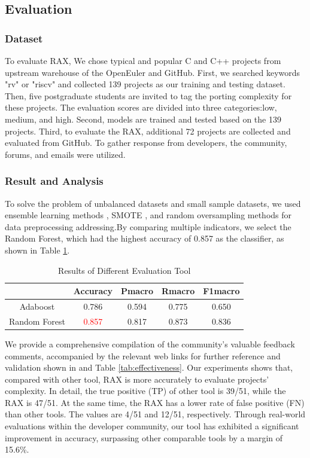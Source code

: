 \documentclass[sigconf,screen,review,anonymous]{acmart}
\begin{document}
{\subsection{Evaluation}
\subsubsection{Dataset}
 To evaluate RAX, We chose typical and popular C and C++ projects from upstream warehouse of the OpenEuler and GitHub\citep{stage2023}. First, we searched keywords "rv" or "riscv" and collected 139 projects as our training and testing dataset. Then, five postgraduate students are invited to tag the porting complexity for these projects. The evaluation scores are divided into three categories:low, medium, and high\citep{githubss}. Second, models are trained and tested based on the 139 projects. Third, to evaluate the RAX, additional 72 projects are collected and evaluated from GitHub. To gather response from developers, the community, forums, and emails were utilized. 
\subsubsection{Result and Analysis}
To solve the problem of unbalanced datasets and small sample datasets, we used ensemble learning methods \cite{6509481}, SMOTE \cite{4271036}, and random oversampling methods for data preprocessing\cite{5128907} addressing.By comparing multiple indicators, we select the Random Forest, which had the highest accuracy of 0.857 as the classifier, as shown in Table \ref{tab:evaluation}.

\begin{table}
  \caption{Results of Different Evaluation Tool}
  \label{tab:evaluation}
  \begin{tabular}{ccccc}
    \toprule
     & Accuracy & Pmacro & Rmacro & F1macro \\
    \midrule
    Adaboost & 0.786 & 0.594 & 0.775 & 0.650 \\
    Random Forest & \textcolor{red}{0.857} & 0.817 & 0.873 & 0.836 \\
  \bottomrule
\end{tabular}
\end{table}

We provide a comprehensive compilation of the community's valuable feedback comments, accompanied by the relevant web links for further reference and validation shown in \cite{githubss} and Table \ref{tab:effectiveness}. Our experiments shows that, compared with other tool, RAX is more accurately to evaluate projects' complexity. In detail, the true positive (TP) of other tool is 39/51, while the RAX is 47/51.  At the same time, the RAX has a lower rate of false positive (FN) than other tools. The values are 4/51 and 12/51, respectively. Through real-world evaluations within the developer community, our tool has exhibited a significant improvement in accuracy, surpassing other comparable tools by a margin of 15.6\%. 

}
\end{document}
